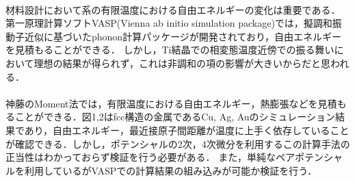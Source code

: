 \documentclass[12pt, a4paper]{jarticle}
\newcommand{\講演番号}
{}
\newcommand{\講演題目}
{非調和振動の効果を入れた有限温度自由エネルギー計算}
\newcommand{\英文題目}
{Free energy calculation of finite temperature with anharmonic effects.}
\newcommand{\和文所属}
{関西学院大・理工}
\newcommand{\和文氏名}
{榊原健，西谷滋人}
\newcommand{\英文所属}
{Department of Informatics, Kwansei Gakuin Univ}
\newcommand{\英文氏名}
{K. Sakakibara, S. R. Nishitani}
\newlength\題目幅
\newlength\ヘッダ項目間隔
\newlength\所属インデント
\newlength\和文氏名インデント
\newlength\英文氏名インデント
\newlength\最小所属氏名間隔
\newlength\ヘッダ行間隔
\newlength\本文行間隔
\newlength\上端余白
\newlength\左端余白
\begin{document}
\setlength\parindent{1zw}\setlength\baselineskip{\本文行間隔}
\vspace*{\本文行間隔}



\paragraph{}
材料設計において系の有限温度における自由エネルギーの変化は重要である．
第一原理計算ソフトVASP(Vienna ab initio simulation package)では，擬調和振動子近似に基づいたphonon計算パッケージが開発されており，自由エネルギーを見積もることができる\cite{phonon}．
しかし，Ti結晶での相変態温度近傍での振る舞いにおいて理想の結果が得られず，これは非調和の項の影響が大きいからだと思われる．
\paragraph{}
神藤のMoment法では，有限温度における自由エネルギー，熱膨張などを見積もることができる\cite{jindo}．図1,2はfcc構造の金属であるCu, Ag, Auのシミュレーション結果であり，自由エネルギー，最近接原子間距離が温度に上手く依存していることが確認できる．しかし，ポテンシャルの2次，4次微分を利用するこの計算手法の正当性はわかっておらず検証を行う必要がある．
また，単純なペアポテンシャルを利用しているがVASPでの計算結果の組み込みが可能か検証を行う．
\end{document}
